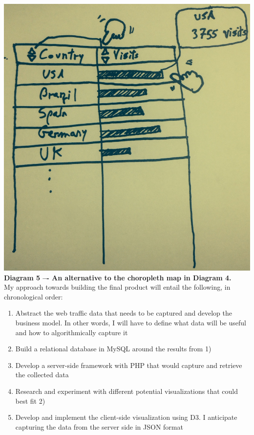\documentclass[12pt]{article}
\begin{document}
\noindent\includegraphics[scale=0.3]{img/table}
\noindent\textbf{Diagram 5 –- An alternative to the choropleth map in Diagram 4.} \\

My approach towards building the final product will entail the following, in chronological order:
\begin{enumerate}
\item Abstract the web traffic data that needs to be captured and develop the business model. In other words, I will have to define what data will be useful and how to algorithmically capture it
\item Build a relational database in MySQL around the results from 1)
\item Develop a server-side framework with PHP that would capture and retrieve the collected data
\item Research and experiment with different potential visualizations that could best fit 2)
\item Develop and implement the client-side visualization using D3. I anticipate capturing the data from the server side in JSON format
\end{enumerate}

\vfill
\end{document}
